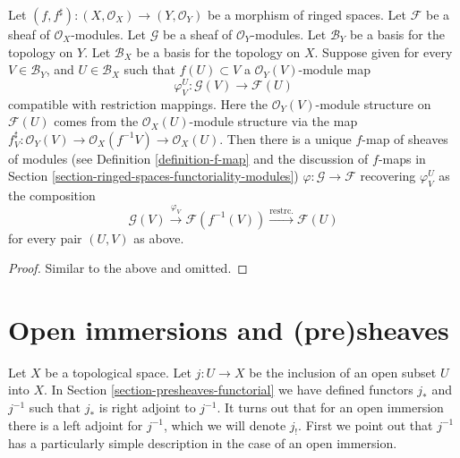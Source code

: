 \begin{lemma}
\label{lemma-f-map-basis-above-and-below-modules}
Let $(f, f^\sharp) : (X, \mathcal{O}_X) \to (Y, \mathcal{O}_Y)$
be a morphism of ringed spaces.
Let $\mathcal{F}$ be a sheaf of $\mathcal{O}_X$-modules.
Let $\mathcal{G}$ be a sheaf of $\mathcal{O}_Y$-modules.
Let $\mathcal{B}_Y$ be a basis for the topology on $Y$.
Let $\mathcal{B}_X$ be a basis for the topology on $X$.
Suppose given for every $V \in \mathcal{B}_Y$, and
$U \in \mathcal{B}_X$ such that $f(U) \subset V$ a
$\mathcal{O}_Y(V)$-module map
$$
\varphi_V^U :
\mathcal{G}(V)
\longrightarrow
\mathcal{F}(U)
$$
compatible with restriction mappings. Here the 
$\mathcal{O}_Y(V)$-module structure on $\mathcal{F}(U)$
comes from the $\mathcal{O}_X(U)$-module structure
via the map $f^\sharp_V : \mathcal{O}_Y(V) 
\to \mathcal{O}_X(f^{-1}V) \to \mathcal{O}_X(U)$.
Then there is a unique $f$-map of sheaves of modules (see
Definition \ref{definition-f-map} and the discussion
of $f$-maps in Section \ref{section-ringed-spaces-functoriality-modules})
$\varphi : \mathcal{G} \to \mathcal{F}$
recovering $\varphi_V^U$ as the composition
$$
\mathcal{G}(V) \xrightarrow{\varphi_V}
\mathcal{F}(f^{-1}(V)) \xrightarrow{\text{restrc.}}
\mathcal{F}(U)
$$
for every pair $(U, V)$ as above.
\end{lemma}

\begin{proof}
Similar to the above and omitted.
\end{proof}

\section{Open immersions and (pre)sheaves}
\label{section-open-immersions}

\noindent
Let $X$ be a topological space.
Let $j : U \to X$ be the inclusion of an open subset $U$ into $X$.
In Section \ref{section-presheaves-functorial} we have defined
functors $j_*$ and $j^{-1}$ such that $j_*$ is right adjoint to
$j^{-1}$. It turns out that for an open immersion there is a left adjoint
for $j^{-1}$, which we will denote $j_!$. First we point out that
$j^{-1}$ has a particularly simple description in the case of
an open immersion.

